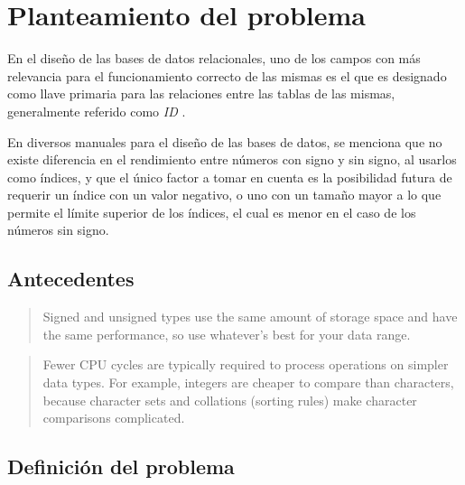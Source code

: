 \section{Planteamiento del problema}


En el diseño de las bases de datos relacionales, uno de los campos con más relevancia para el funcionamiento correcto de las mismas es el que es designado como llave primaria para las relaciones entre las tablas de las mismas, generalmente referido como \textit{ID} \cite{Schwartz_2012}.

En diversos manuales para el diseño de las bases de datos, se menciona que no existe diferencia en el rendimiento entre números con signo y sin signo, al usarlos como índices, y que el único factor a tomar en cuenta es la posibilidad futura de requerir un índice con un valor negativo, o uno con un tamaño mayor a lo que permite el límite superior de los índices, el cual es menor en el caso de los números sin signo.




\subsection{Antecedentes}\label{sec:Ant}

\begin{quote}
   Signed and unsigned types use the same amount of storage space and have the same performance, so use whatever’s best for your data range.
   \cite{Schwartz_2012}
\end{quote}

\begin{quote}
   Fewer CPU cycles are typically required to process operations on simpler data types. For example, integers are cheaper to compare than characters, because character sets and collations (sorting rules) make character comparisons complicated.
   \cite{Schwartz_2012}
\end{quote}
\subsection{Definición del problema}
